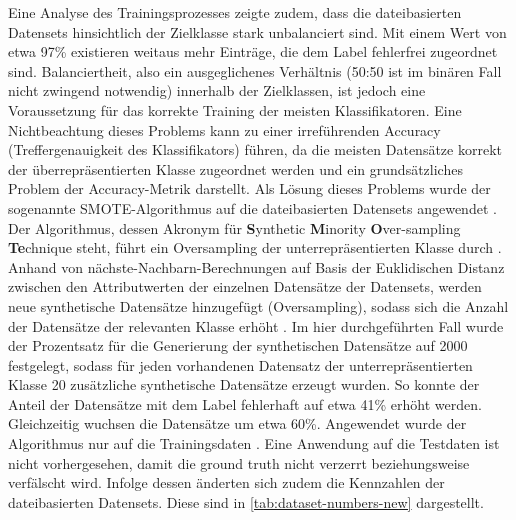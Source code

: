 \label{smote}
Eine Analyse des Trainingsprozesses zeigte zudem, dass die dateibasierten Datensets hinsichtlich der Zielklasse stark unbalanciert sind. Mit einem Wert von etwa 97\% existieren weitaus mehr Einträge, die dem Label \glqq fehlerfrei\grqq{} zugeordnet sind. Balanciertheit, also ein ausgeglichenes Verhältnis (50:50 ist im binären Fall nicht zwingend notwendig) innerhalb der Zielklassen, ist jedoch eine Voraussetzung für das korrekte Training der meisten Klassifikatoren. Eine Nichtbeachtung dieses Problems kann zu einer irreführenden Accuracy (Treffergenauigkeit des Klassifikators) führen, da die meisten Datensätze korrekt der überrepräsentierten Klasse zugeordnet werden und ein grundsätzliches Problem der Accuracy-Metrik darstellt. Als Lösung dieses Problems wurde der sogenannte SMOTE-Algorithmus auf die dateibasierten Datensets angewendet \cite{Chawla2002}. Der Algorithmus, dessen Akronym für \textbf{S}ynthetic \textbf{M}inority \textbf{O}ver-sampling \textbf{Te}chnique steht, führt ein Oversampling der unterrepräsentierten Klasse durch \cite{Chawla2002}. Anhand von nächste-Nachbarn-Berechnungen auf Basis der Euklidischen Distanz zwischen den Attributwerten der einzelnen Datensätze der Datensets, werden neue synthetische Datensätze hinzugefügt (Oversampling), sodass sich die Anzahl der Datensätze der relevanten Klasse erhöht \cite{Chawla2002}. Im hier durchgeführten Fall wurde der Prozentsatz für die Generierung der synthetischen Datensätze auf 2000 festgelegt, sodass für jeden vorhandenen Datensatz der unterrepräsentierten Klasse 20 zusätzliche synthetische Datensätze erzeugt wurden. So konnte der Anteil der Datensätze mit dem Label \glqq fehlerhaft\grqq{} auf etwa 41\% erhöht werden. Gleichzeitig wuchsen die Datensätze um etwa 60\%. Angewendet wurde der Algorithmus nur auf die Trainingsdaten \cite{Chawla2002} . Eine Anwendung auf die Testdaten ist nicht vorhergesehen, damit die \glqq ground truth\grqq{} nicht verzerrt beziehungsweise verfälscht wird. Infolge dessen änderten sich zudem die Kennzahlen der dateibasierten Datensets. Diese sind in \autoref{tab:dataset-numbers-new} dargestellt.

